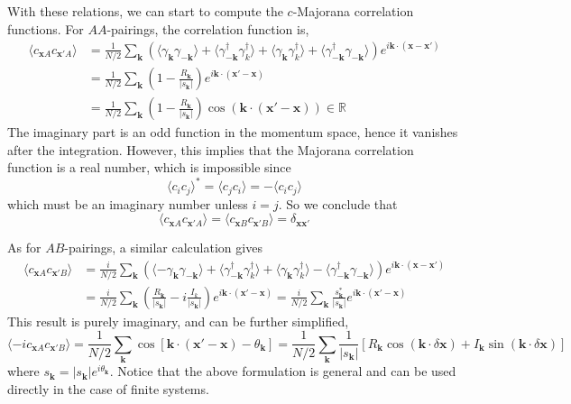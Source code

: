 \documentclass[12font]{article}
\theoremstyle{definition}
\newcommand{\anglelr}[1]{\langle #1 \rangle}
\newcommand{\lr}[1]{\left(  #1  \right)}
\newcommand{\lrm}[1]{\left[  #1  \right]}
\newcommand{\abs}[1]{\left|  #1  \right|}
\newcommand{\bo}[1]{\mathbf{#1}}
\begin{document}
With these relations, we can start to compute the $c$-Majorana correlation functions. For $AA$-pairings, the correlation function is,
\begin{align*}
  \anglelr{c_{\bo{x}A}c_{\bo{x}'A}} &= \frac{1}{N/2}\sum_{\bo{k}}\lr{ \anglelr{\gamma_{\bo{k}}\gamma_{-\bo{k}}} + \anglelr{\gamma_{-\bo{k}}^\dagger\gamma^\dagger_{k}} +
  \anglelr{\gamma_{\bo{k}}\gamma_{k}^\dagger} + 
  \anglelr{\gamma_{-\bo{k}}^\dagger\gamma_{-\bo{k}}}
  }e^{i\bo{k}\cdot\lr{\bo{x}-\bo{x'}}} \\
  &= \frac{1}{N/2}\sum_{\bo{k}}\lr{1-\frac{R_{\bo{k}}}{\abs{s_{\bo{k}}}}}e^{i\bo{k}\cdot\lr{\bo{x}'-\bo{x}}} \\
  &= \frac{1}{N/2}\sum_{\bo{k}}\lr{1-\frac{R_{\bo{k}}}{\abs{s_{\bo{k}}}}}\cos\lr{\bo{k}\cdot\lr{\bo{x}'-\bo{x}}} \in \mathbb{R}
\end{align*}
The imaginary part is an odd function in the momentum space, hence it vanishes after the integration. However, this implies that the Majorana correlation function is a real number, which is impossible since
\[
\anglelr{c_ic_j}^* = \anglelr{c_jc_i} = -\anglelr{c_ic_j}
\]
which must be an imaginary number unless $i=j$. So we conclude that
\begin{equation}\label{correlationAA.e}
  \anglelr{c_{\bo{x}A}c_{\bo{x'}A}} = \anglelr{c_{\bo{x}B}c_{\bo{x'}B}} = \delta_{\bo{x}\bo{x'}}
\end{equation}


As for $AB$-pairings, a similar calculation gives
\begin{align*}
  \anglelr{c_{\bo{x}A}c_{\bo{x}'B}} &= \frac{i}{N/2}\sum_{\bo{k}}\lr{ \anglelr{-\gamma_{\bo{k}}\gamma_{-\bo{k}}} + \anglelr{\gamma_{-\bo{k}}^\dagger\gamma^\dagger_{k}} +
  \anglelr{\gamma_{\bo{k}}\gamma_{k}^\dagger} - 
  \anglelr{\gamma_{-\bo{k}}^\dagger\gamma_{-\bo{k}}}
  }e^{i\bo{k}\cdot\lr{\bo{x}-\bo{x'}}} \\
  &= \frac{i}{N/2}\sum_{\bo{k}}\lr{\frac{R_{\bo{k}}}{\abs{s_{\bo{k}}}} - i\frac{I_k}{\abs{s_{\bo{k}}}}}e^{i\bo{k}\cdot\lr{\bo{x}'-\bo{x}}} = \frac{i}{N/2}\sum_{\bo{k}}\frac{s^*_{\bo{k}}}{\abs{s_{\bo{k}}}}e^{i\bo{k}\cdot\lr{\bo{x}'-\bo{x}}} 
\end{align*}
This result is purely imaginary, and can be further simplified,
\begin{equation}\label{eq:correlationAB}
  \anglelr{-ic_{\bo{x}A}c_{\bo{x}'B}} 
  = 
  \frac{1}{N/2}\sum_{\bo{k}}\cos\lrm{\bo{k}\cdot\lr{\bo{x}'-\bo{x}} - \theta_{\bo{k}}} 
  = 
  \frac{1}{N/2}
  \sum_{\bo{k}}
  \frac{1}{\abs{s_{\bo{k}}}}\lrm{R_{\bo{k}} \cos\lr{\bo{k} \cdot \delta\bo{x}} + I_{\bo{k}}\sin\lr{\bo{k}\cdot\delta\bo{x}} }
\end{equation}
where $s_{\bo{k}} = \abs{s_{\bo{k}}}e^{i\theta_{\bo{k}}}$. Notice that the above formulation is general and can be used directly in the case of finite systems.
\end{document}
